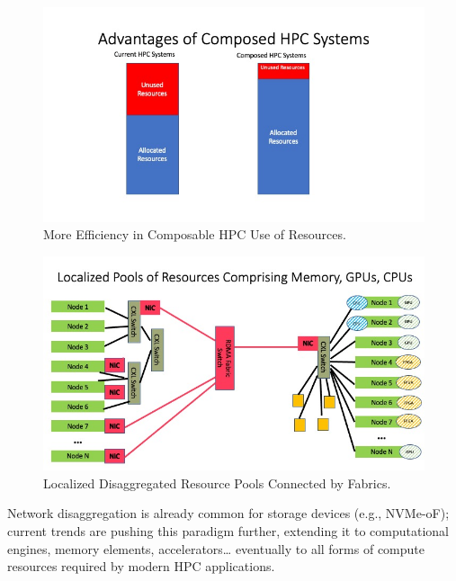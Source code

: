 \begin{figure}
\centerline{\includegraphics[width=\columnwidth]{Slide3.jpeg}}
\caption{More Efficiency in Composable HPC Use of Resources.} 
\label{fig:stranded}
\end{figure}

\begin{figure}
\centerline{\includegraphics[width=\columnwidth]{Slide4.jpeg}}
\caption{Localized Disaggregated Resource Pools Connected by Fabrics.} 
\label{fig:Pools}
\end{figure}

Network disaggregation is already common for storage devices (e.g., NVMe-oF); current trends are pushing this paradigm further, extending it to computational engines, memory elements, accelerators… eventually to all forms of compute resources required by modern HPC applications.  

